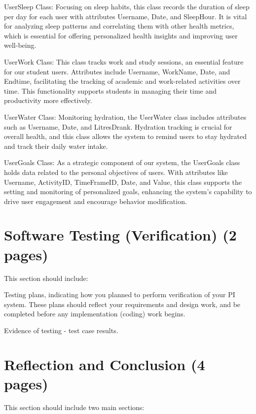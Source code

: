 \documentclass[12pt]{article}
\begin{document}
UserSleep Class: Focusing on sleep habits, this class records the duration of sleep per day for each user with attributes Username, Date, and SleepHour. It is vital for analyzing sleep patterns and correlating them with other health metrics, which is essential for offering personalized health insights and improving user well-being.\par

UserWork Class: This class tracks work and study sessions, an essential feature for our student users. Attributes include Username, WorkName, Date, and Endtime, facilitating the tracking of academic and work-related activities over time. This functionality supports students in managing their time and productivity more effectively.\par

UserWater Class: Monitoring hydration, the UserWater class includes attributes such as Username, Date, and LitresDrank. Hydration tracking is crucial for overall health, and this class allows the system to remind users to stay hydrated and track their daily water intake.\par

UserGoals Class: As a strategic component of our system, the UserGoals class holds data related to the personal objectives of users. With attributes like Username, ActivityID, TimeFrameID, Date, and Value, this class supports the setting and monitoring of personalized goals, enhancing the system's capability to drive user engagement and encourage behavior modification.\par



\section{Software Testing (Verification) (2 pages)}

This section should include:

Testing plans, indicating how you planned to perform verification of your PI system.
These plans should reflect your requirements and design work, and be completed
before any implementation (coding) work begins.

Evidence of testing - test case results.


\section{Reflection and Conclusion (4 pages)}

This section should include two main sections:
\end{document}
